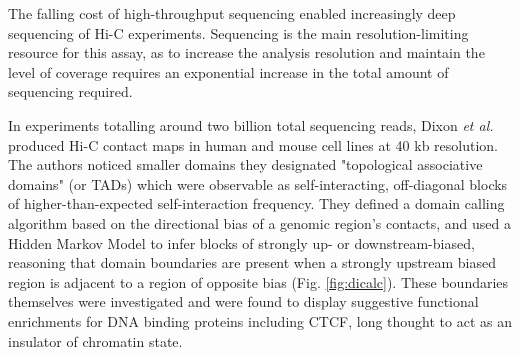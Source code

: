 \documentclass[a4paper,10pt,oneside]{book}
\begin{document}
The falling cost of high-throughput sequencing enabled increasingly deep sequencing of Hi-C experiments. Sequencing is the main resolution-limiting resource for this assay, as to increase the analysis resolution and maintain the level of coverage requires an exponential increase in the total amount of sequencing required.\cite{Lieberman2009}

In experiments totalling around two billion total sequencing reads, Dixon \emph{et al.}\cite{Dixon2012} produced Hi-C contact maps in human and mouse cell lines at 40 kb resolution. The authors noticed smaller domains they designated "topological associative domains" (or TADs) which were observable as self-interacting, off-diagonal blocks of higher-than-expected self-interaction frequency. They defined a domain calling algorithm based on the directional bias of a genomic region's contacts, and used a Hidden Markov Model to infer blocks of strongly up- or downstream-biased, reasoning that domain boundaries are present when a strongly upstream biased region is adjacent to a region of opposite bias (Fig. \ref{fig:dicalc}). These boundaries themselves were investigated and were found to display suggestive functional enrichments for DNA binding proteins including CTCF, long thought to act as an insulator of chromatin state.
\end{document}
